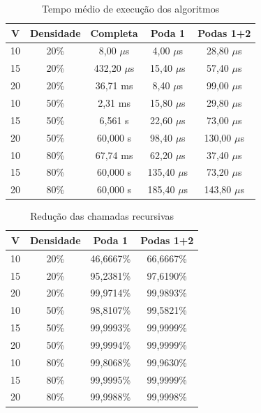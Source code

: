 
\begin{table}[htbp]
\centering
\caption{Tempo médio de execução dos algoritmos}
\label{tab:tempos_tarefa6}
\small
\begin{tabular}{ccccc}
\hline
V & Densidade & Completa & Poda 1 & Podas 1+2 \\
\hline
10 & 20\% & 8,00 $\mu$s & 4,00 $\mu$s & 28,80 $\mu$s \\
15 & 20\% & 432,20 $\mu$s & 15,40 $\mu$s & 57,40 $\mu$s \\
20 & 20\% & 36,71 ms & 8,40 $\mu$s & 99,00 $\mu$s \\
10 & 50\% & 2,31 ms & 15,80 $\mu$s & 29,80 $\mu$s \\
15 & 50\% & 6,561 s & 22,60 $\mu$s & 73,00 $\mu$s \\
20 & 50\% & 60,000 s & 98,40 $\mu$s & 130,00 $\mu$s \\
10 & 80\% & 67,74 ms & 62,20 $\mu$s & 37,40 $\mu$s \\
15 & 80\% & 60,000 s & 135,40 $\mu$s & 73,20 $\mu$s \\
20 & 80\% & 60,000 s & 185,40 $\mu$s & 143,80 $\mu$s \\
\hline
\end{tabular}
\end{table}

\begin{table}[htbp]
\centering
\caption{Redução das chamadas recursivas}
\label{tab:reducoes_tarefa6}
\small
\begin{tabular}{cccc}
\hline
V & Densidade & Poda 1 & Podas 1+2 \\
\hline
10 & 20\% & 46,6667\% & 66,6667\% \\
15 & 20\% & 95,2381\% & 97,6190\% \\
20 & 20\% & 99,9714\% & 99,9893\% \\
10 & 50\% & 98,8107\% & 99,5821\% \\
15 & 50\% & 99,9993\% & 99,9999\% \\
20 & 50\% & 99,9994\% & 99,9999\% \\
10 & 80\% & 99,8068\% & 99,9630\% \\
15 & 80\% & 99,9995\% & 99,9999\% \\
20 & 80\% & 99,9988\% & 99,9998\% \\
\hline
\end{tabular}
\end{table}
